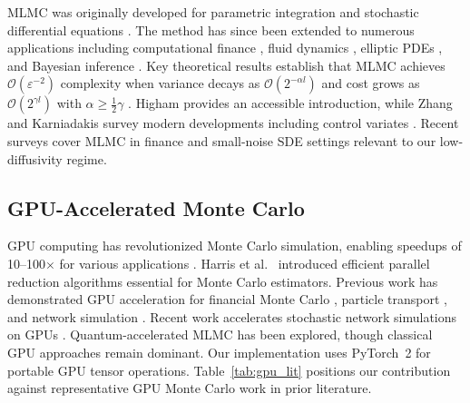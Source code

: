 \documentclass{ieeeaccess}
\begin{document}
MLMC was originally developed for parametric integration \cite{heinrich2001multilevel} and
stochastic differential equations \cite{giles2008multilevel}. The method has since been extended
to numerous applications including computational finance \cite{giles2012finance, glasserman2003monte},
fluid dynamics \cite{mishra2012sparse}, elliptic PDEs \cite{cliffe2015}, and Bayesian inference
\cite{dodwell2015hierarchical}. Key theoretical results establish that MLMC achieves
$\mathcal{O}(\varepsilon^{-2})$ complexity when variance decays as $\mathcal{O}(2^{-\alpha l})$
and cost grows as $\mathcal{O}(2^{\gamma l})$ with $\alpha \geq \frac{1}{2}\gamma$
\cite{giles2015multilevel}. Higham \cite{higham2015} provides an accessible introduction, while
Zhang and Karniadakis \cite{zhang2020} survey modern developments including control variates
\cite{hickernell2005, lapeyre2003}. Recent surveys cover MLMC in finance \cite{giles2024review}
and small-noise SDE settings \cite{spiliopoulos2022multilevel} relevant to our low-diffusivity
regime.

\subsection{GPU-Accelerated Monte Carlo}

GPU computing has revolutionized Monte Carlo simulation, enabling speedups of 10--100$\times$
for various applications \cite{nvidia2020cuda, owens2008}. Harris et al.\ \cite{harris2007}
introduced efficient parallel reduction algorithms essential for Monte Carlo estimators. Previous
work has demonstrated GPU acceleration for financial Monte Carlo \cite{thompson2010gpu}, particle
transport \cite{bergmann2017gpu}, and network simulation \cite{perumalla2011discrete}. Recent work
accelerates stochastic network simulations on GPUs \cite{sha2023gpu}. Quantum-accelerated MLMC
\cite{an2021} has been explored, though classical GPU approaches remain dominant. Our
implementation uses PyTorch~2 \cite{pytorch2024} for portable GPU tensor operations.
Table~\ref{tab:gpu_lit} positions our contribution against representative GPU Monte Carlo work
in prior literature.
\end{document}

